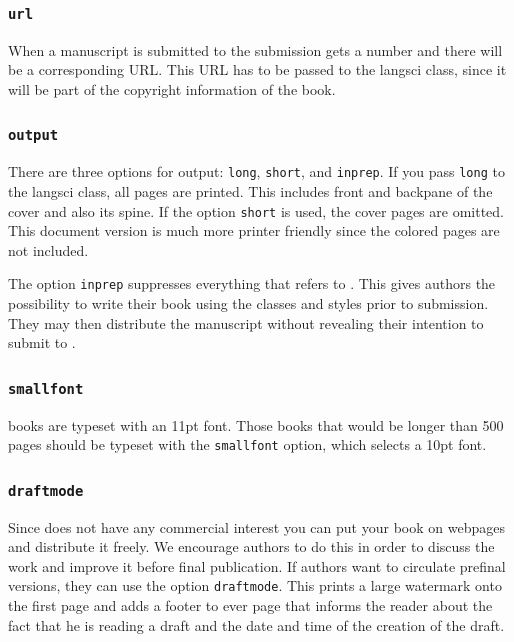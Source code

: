 \subsubsection{\texttt{url}}

When a manuscript is submitted to \lsp the submission gets a number and there will be a
corresponding URL. This URL has to be passed to the langsci class, since it will be part of the
copyright information of the book.

\subsubsection{\texttt{output}}

There are three options for output: \texttt{long}, \texttt{short}, and \texttt{inprep}. If you pass
\texttt{long} to the langsci class, all pages are printed. This includes front and backpane of the
cover and also its spine. If the option \texttt{short} is used, the cover pages are omitted. This
document version is much more printer friendly since the colored pages are not included.

The option \texttt{inprep} suppresses everything that refers to \lsp. This gives authors the
possibility to write their book using the \lsp classes and styles prior to submission. They may then
distribute the manuscript without revealing their intention to submit to \lsp.

\subsubsection{\texttt{smallfont}}

\lsp{} books are typeset with an 11pt font. Those books that would be longer than 500 pages should be
typeset with the \texttt{smallfont} option, which selects a 10pt font.

\subsubsection{\texttt{draftmode}}

Since \lsp does not have any commercial interest you can put your book on webpages and distribute it
freely. We encourage authors to do this in order to discuss the work and improve it before final
publication. If authors want to circulate prefinal versions, they can use the option
\texttt{draftmode}. This prints a large watermark onto the first page and adds a footer to ever page
that informs the reader about the fact that he is reading a draft and the date and time of the
creation of the draft.


